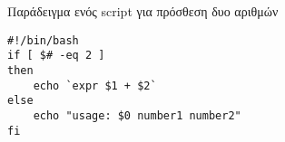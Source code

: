 Παράδειγμα ενός script για πρόσθεση δυο αριθμών
\begin{lstlisting}
#!/bin/bash
if [ $# -eq 2 ]
then
	echo `expr $1 + $2`
else
	echo "usage: $0 number1 number2"
fi
\end{lstlisting}
	





